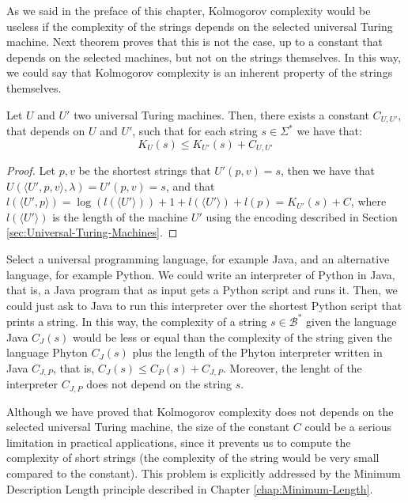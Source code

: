 As we said in the preface of this chapter, Kolmogorov complexity would be useless if the complexity of the strings depends on the selected universal Turing machine. Next theorem proves that this is not the case, up to a constant that depends on the selected machines, but not on the strings themselves. In this way, we could say that Kolmogorov complexity is an inherent property of the strings themselves.

\begin{theorem}
\label{def:Invariance-theorem}
Let $U$ and $U'$ two universal Turing machines. Then, there exists a constant $C_{U, U'}$, that depends on $U$ and $U'$, such that for each string $s \in \Sigma^{\ast}$ we have that:
\[
K_{U}(s) \leq K_{U'}(s) + C_{U, U'}
\]
\end{theorem}
\begin{proof}
Let $p, v$ be the shortest strings that $U'(p,v)=s$, then we have that $U(\langle U',p, v \rangle, \lambda) = U'(p, v) = s$, and that $l(\langle U',p \rangle) = \log(l(\langle U' \rangle)) + 1 + l(\langle U' \rangle) + l(p) = K_{U'}(s) + C$, where $l(\langle U' \rangle)$ is the length of the machine $U'$ using the encoding described in Section \ref{sec:Universal-Turing-Machines}.
\end{proof}

\begin{example}
Select a universal programming language, for example Java, and an alternative language, for example Python. We could write an interpreter of Python in Java, that is, a Java program that as input gets a Python script and runs it. Then, we could just ask to Java to run this interpreter over the shortest Python script that prints a string. In this way, the complexity of a string $s \in \mathcal{B}^\ast$ given the language Java $C_J(s)$ would be less or equal than the complexity of the string given the language Phyton $C_J(s)$ plus the length of the Phyton interpreter written in Java $C_{J,P}$, that is, $C_J(s) \leq C_P(s) + C_{J,P}$.  Moreover, the lenght of the interpreter $C_{J,P}$ does not depend on the string $s$.
\end{example}

Although we have proved that Kolmogorov complexity does not depends on the selected universal Turing machine, the size of the constant $C$ could be a serious limitation in practical applications, since it prevents us to compute the complexity of short strings (the complexity of the string would be very small compared to the constant). This problem is explicitly addressed by the Minimum Description Length principle described in Chapter \ref{chap:Minimum-Length}.

